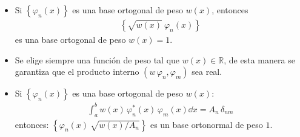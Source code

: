 \begin{itemize}
\item Si $\left\{ \varphi_{n} (x) \right\}$ es una base ortogonal de peso $w(x)$, entonces 
\begin{align*}
\left\{ \sqrt{w(x)} \: \varphi_{n} (x) \right\}
\end{align*}
es una base ortogonal de peso $w(x) = 1$.
\item Se elige siempre una función de peso tal que $w(x) \in \mathbb{R}$, de esta manera se garantiza que el producto interno $(w \, \varphi_{n}, \varphi_{m})$ sea real.
\item Si $\left\{ \varphi_{n} (x) \right\}$ es una base ortogonal de peso $w(x)$:
\begin{align*}
\int_{a}^{b} w(x) \,  \varphi_{n}^{*} (x) \, \varphi_{m} (x) \dd{x} = A_{n} \, \delta_{nm}
\end{align*}
entonces: $\left\{ \varphi_{n} (x) \: \sqrt{w(x) / A_{n}} \right\}$ es un base ortonormal de peso $1$.
\end{itemize}

